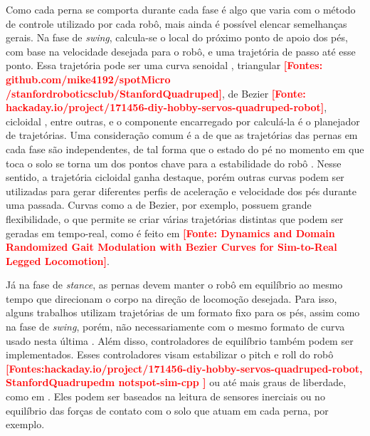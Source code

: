 \documentclass[../main.tex]{subfiles}
\begin{document}
  Como cada perna se comporta durante cada fase é algo que varia com o método de controle utilizado por cada robô, mais ainda é possível elencar semelhanças gerais. Na fase de \textit{\textit{swing}}, calcula-se o local do próximo ponto de apoio dos pés, com base na velocidade desejada para o robô, e uma trajetória de passo até esse ponto. Essa trajetória pode ser uma curva senoidal \cite{X.118}, triangular \textbf{\textcolor{red}{[Fontes: github.com/mike4192/spotMicro /stanfordroboticsclub/StanfordQuadruped]}}, de Bezier \textbf{\textcolor{red}{[Fonte: hackaday.io/project/171456-diy-hobby-servos-quadruped-robot]}}, cicloidal \cite{Shi2021} \cite{X.58}, entre outras, e o componente encarregado por calculá-la é o planejador de trajetórias. Uma consideração comum é a de que as trajetórias das pernas em cada fase são independentes, de tal forma que o estado do pé no momento em que toca o solo se torna um dos pontos chave para a estabilidade do robô  \cite{X.118}. Nesse sentido, a trajetória cicloidal ganha destaque, porém outras curvas podem ser utilizadas para gerar diferentes perfis de aceleração e velocidade dos pés durante uma passada. Curvas como a de Bezier, por exemplo, possuem grande flexibilidade, o que permite se criar várias trajetórias distintas que podem ser geradas em tempo-real, como é feito em  \textbf{\textcolor{red}{[Fonte: Dynamics and Domain Randomized Gait Modulation with Bezier Curves for Sim-to-Real Legged Locomotion]}}.

  Já na fase de \textit{\textit{stance}}, as pernas devem manter o robô em equilíbrio ao mesmo tempo que direcionam o corpo na direção de locomoção desejada. Para isso, alguns trabalhos utilizam trajetórias de um formato fixo para os pés, assim como na fase de \textit{\textit{swing}}, porém, não necessariamente com o mesmo formato de curva usado nesta última \cite{X.118} \cite{X.58}. Além disso, controladores de equilíbrio também podem ser implementados. Esses controladores visam estabilizar o pitch e roll do robô \cite{Shi2021} \textbf{\textcolor{red}{[Fontes:hackaday.io/project/171456-diy-hobby-servos-quadruped-robot, StanfordQuadrupedm notspot-sim-cpp ]}} ou até mais graus de liberdade, como em \cite{Chen2020140736} \cite{X.134} \cite{Zhang2016284}. Eles podem ser baseados na leitura de sensores inerciais ou no equilíbrio das forças de contato com o solo que atuam em cada perna, por exemplo.
\end{document}
